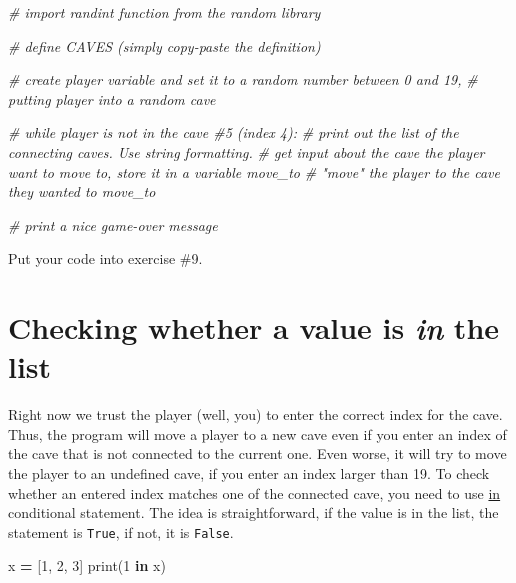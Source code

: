 \documentclass[
]{book}
\newenvironment{Shaded}{\begin{snugshade}}{\end{snugshade}}
\newcommand{\BuiltInTok}[1]{#1}
\newcommand{\CommentTok}[1]{\textcolor[rgb]{0.56,0.35,0.01}{\textit{#1}}}
\newcommand{\DecValTok}[1]{\textcolor[rgb]{0.00,0.00,0.81}{#1}}
\newcommand{\KeywordTok}[1]{\textcolor[rgb]{0.13,0.29,0.53}{\textbf{#1}}}
\newcommand{\NormalTok}[1]{#1}
\newcommand{\OperatorTok}[1]{\textcolor[rgb]{0.81,0.36,0.00}{\textbf{#1}}}
\begin{document}
\begin{Shaded}
\begin{Highlighting}[]
\CommentTok{\# import randint function from the random library}

\CommentTok{\# define CAVES (simply copy{-}paste the definition)}

\CommentTok{\# create \textasciigrave{}player\textasciigrave{} variable and set it to a random number between 0 and 19, }
\CommentTok{\# putting player into a random cave}

\CommentTok{\# while player is not in the cave \#5 (index 4):}
    \CommentTok{\# print out the list of the connecting caves. Use string formatting.}
    \CommentTok{\# get input about the cave the player want to move to, store it in a variable \textasciigrave{}move\_to\textasciigrave{}}
    \CommentTok{\# "move" the \textasciigrave{}player\textasciigrave{} to the cave they wanted to \textasciigrave{}move\_to\textasciigrave{}}
    
\CommentTok{\# print a nice game{-}over message}
\end{Highlighting}
\end{Shaded}

Put your code into exercise \#9.

\hypertarget{checking-whether-a-value-is-in-the-list}{%
\section{\texorpdfstring{Checking whether a value is \emph{in} the list}{Checking whether a value is in the list}}\label{checking-whether-a-value-is-in-the-list}}

Right now we trust the player (well, you) to enter the correct index for the cave. Thus, the program will move a player to a new cave even if you enter an index of the cave that is not connected to the current one. Even worse, it will try to move the player to an undefined cave, if you enter an index larger than 19. To check whether an entered index matches one of the connected cave, you need to use \href{https://docs.python.org/3/tutorial/datastructures.html\#more-on-conditions}{ in } conditional statement. The idea is straightforward, if the value is in the list, the statement is \texttt{True}, if not, it is \texttt{False}.

\begin{Shaded}
\begin{Highlighting}[]
\NormalTok{x }\OperatorTok{=}\NormalTok{ [}\DecValTok{1}\NormalTok{, }\DecValTok{2}\NormalTok{, }\DecValTok{3}\NormalTok{]}
\BuiltInTok{print}\NormalTok{(}\DecValTok{1} \KeywordTok{in}\NormalTok{ x)}
\end{Highlighting}
\end{Shaded}
\end{document}

